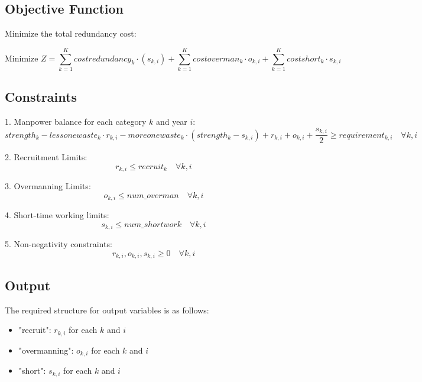 \documentclass{article}
\begin{document}
\subsection*{Objective Function}
Minimize the total redundancy cost:

\[
\text{Minimize } Z = \sum_{k=1}^{K} costredundancy_{k} \cdot (s_{k,i}) + \sum_{k=1}^{K} costoverman_{k} \cdot o_{k,i} + \sum_{k=1}^{K} costshort_{k} \cdot s_{k,i}
\]

\subsection*{Constraints}
1. Manpower balance for each category \( k \) and year \( i \):
\[
strength_{k} - lessonewaste_{k} \cdot r_{k,i} - moreonewaste_{k} \cdot (strength_{k} - s_{k,i}) + r_{k,i} + o_{k,i} + \frac{s_{k,i}}{2} \geq requirement_{k,i} \quad \forall k, i
\]

2. Recruitment Limits:
\[
r_{k,i} \leq recruit_{k} \quad \forall k, i
\]

3. Overmanning Limits:
\[
o_{k,i} \leq num\_overman \quad \forall k, i
\]

4. Short-time working limits:
\[
s_{k,i} \leq num\_shortwork \quad \forall k, i
\]

5. Non-negativity constraints:
\[
r_{k,i}, o_{k,i}, s_{k,i} \geq 0 \quad \forall k, i
\]

\subsection*{Output}
The required structure for output variables is as follows:
\begin{itemize}
    \item "recruit": \( r_{k,i} \) for each \( k \) and \( i \)
    \item "overmanning": \( o_{k,i} \) for each \( k \) and \( i \)
    \item "short": \( s_{k,i} \) for each \( k \) and \( i \)
\end{itemize}
\end{document}

